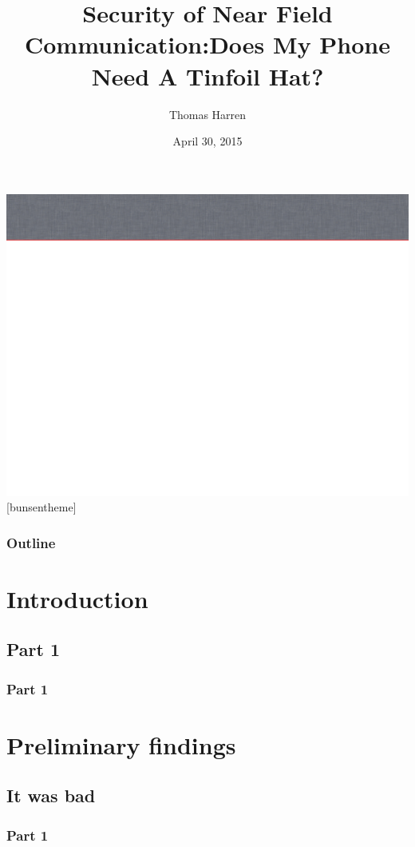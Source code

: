 \documentclass[unknownkeysallowed]{beamer}
\title{Security of Near Field Communication:\break Does My Phone Need A Tinfoil Hat?}
\author{Thomas Harren}
\institute[UMM] %
{
  University of Minnesota, Morris
}
\date[]{April 30, 2015}
\begin{document}
\begin{frame}
  \titlepage
\end{frame}

 {\includegraphics[width=\paperwidth,height=\paperheight]{slide_bg}}
[bunsentheme]


\begin{frame}
  \frametitle{Outline}
\tableofcontents
\end{frame}

\section{Introduction}
\subsection{Part 1}
\begin{frame}
  \frametitle{Part 1}
\end{frame}


\section{Preliminary findings}
\subsection{It was bad}
\begin{frame}
  \frametitle{Part 1}
\end{frame}
\end{document}
